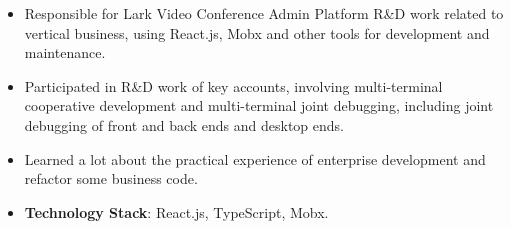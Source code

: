 \documentclass{resume}
\newcommand{\en}[1]{#1}
\newcommand{\zh}[1]{}
\begin{document}
\en{}
\zh{\datedsubsection{\textbf{\href{https://www.bytedance.com/zh/}{字节跳动（ByteDance Inc.）}}}{2021/07 -- 2021/09}}
\en{}
\zh{\role{飞书会议室解决方案团队}{前端研发实习}}
\begin{itemize}
  \item \en{Responsible for Lark Video Conference Admin Platform R\&D work related to vertical business, using React.js, Mobx and other tools for development and maintenance.}
        \zh{负责飞书会议室 Admin 中会议室模块和视频会议模块相关垂直业务的前端研发，使用 React.js 和 Mobx 等工具进行业务等开发和维护}
  \item \en{Participated in R\&D work of key accounts, involving multi-terminal cooperative development and multi-terminal joint debugging, including joint debugging of front and back ends and desktop ends.}
        \zh{参与重点客户相关需求的开发，涉及到了多端合作开发与多端联合调试，包括前后端以及桌面端的联合调试，学到了很多联合调试开发经验}
  \item \en{Learned a lot about the practical experience of enterprise development and refactor some business code.}
        \zh{学到了很多关于 React.js，TypeScript 以及企业级开发流程的实战经验，并对部分业务代码进行重构，例如使用 React Hooks 和 functional components 替代 class based components}
  \item \en{\textbf{Technology Stack}: React.js, TypeScript, Mobx.}
        \zh{\textbf{技术栈}: React.js, TypeScript, Mobx}
\end{itemize}
\end{document}
